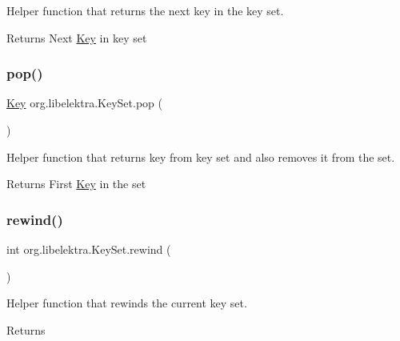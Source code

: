 Helper function that returns the next key in the key set. 

\begin{DoxyReturn}{Returns}
Next \hyperlink{classorg_1_1libelektra_1_1Key}{Key} in key set 
\end{DoxyReturn}
\mbox{\label{classorg_1_1libelektra_1_1KeySet_a6fcb652d72c64772bae40ec801d93ad9}} 
\subsubsection{\texorpdfstring{pop()}{pop()}}
{\footnotesize\ttfamily \hyperlink{classorg_1_1libelektra_1_1Key}{Key} org.\+libelektra.\+Key\+Set.\+pop (\begin{DoxyParamCaption}{ }\end{DoxyParamCaption})\hspace{0.3cm}{\ttfamily [inline]}}



Helper function that returns key from key set and also removes it from the set. 

\begin{DoxyReturn}{Returns}
First \hyperlink{classorg_1_1libelektra_1_1Key}{Key} in the set 
\end{DoxyReturn}
\mbox{\label{classorg_1_1libelektra_1_1KeySet_a20533a5e97b16b76b977b95be179d58c}} 
\subsubsection{\texorpdfstring{rewind()}{rewind()}}
{\footnotesize\ttfamily int org.\+libelektra.\+Key\+Set.\+rewind (\begin{DoxyParamCaption}{ }\end{DoxyParamCaption})\hspace{0.3cm}{\ttfamily [inline]}}



Helper function that rewinds the current key set. 

\begin{DoxyReturn}{Returns}

\end{DoxyReturn}
\mbox{\label{classorg_1_1libelektra_1_1KeySet_adb3caad35c8dfcd1934d7cd32ff0ca4a}} 
